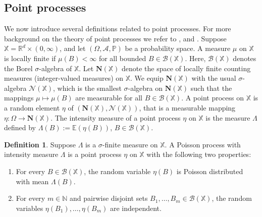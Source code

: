 \documentclass{article}
\newcommand{\NN}{\mathbb{N}}
\newcommand{\RR}{\mathbb{R}}
\newcommand{\PP}{\mathbb{P}}
\newcommand{\EE}{\mathbb{E}}
\theoremstyle{plain}
\theoremstyle{remark}
\theoremstyle{definition}
\newtheorem{definition}[theorem]{Definition}
\begin{document}
\subsection{Point processes}
We now introduce several definitions related to point processes. For more background on the theory of point processes we refer to \cite{Daley2003}, \cite{Daley2008} and \cite{Last2018}. Suppose $\mathbb{X} = \RR^d \times (0,\infty)$, and let $(\Omega, \mathcal{A},\PP)$ be a probability space. A measure $\mu$ on $\mathbb{X}$ is locally finite if $\mu(B) < \infty$ for all bounded $B \in \mathcal{B}(\mathbb{X})$. Here, $\mathcal{B}(\mathbb{X})$ denotes the Borel $\sigma$-algebra of $\mathbb{X}$. Let $\mathbf{N}(\mathbb{X})$ denote the space of locally finite counting measures (integer-valued measures) on $\mathbb{X}$. We equip $\mathbf{N}(\mathbb{X})$ with the usual $\sigma$-algebra $\mathcal{N}(\mathbb{X})$, which is the smallest $\sigma$-algebra on $\mathbf{N}(\mathbb{X})$ such that the mappings $\mu \mapsto \mu(B)$ are measurable for all $B \in \mathcal{B}(\mathbb{X})$. A point process on $\mathbb{X}$ is a random element $\eta$ of $(\mathbf{N}(\mathbb{X}), \mathcal{N}(\mathbb{X}))$, that is a measurable mapping $\eta:\Omega \to \mathbf{N}(\mathbb{X})$. The intensity measure of a point process $\eta$ on $\mathbb{X}$ is the measure $\Lambda$ defined by $\Lambda(B):= \EE(\eta(B))$, $B \in \mathcal{B}(\mathbb{X})$. 

\begin{definition}
    Suppose $\Lambda$ is a $\sigma$-finite measure on $\mathbb{X}$. A Poisson process with intensity measure $\Lambda$ is a point process $\eta$ on $\mathbb{X}$ with the following two properties:
\begin{enumerate}
    \item For every $B \in \mathcal{B}(\mathbb{X})$, the random variable $\eta(B)$ is Poisson distributed with mean $\Lambda(B)$.
    \item For every $m \in \NN$ and pairwise disjoint sets $B_1,\dots,B_m \in \mathcal{B}(\mathbb{X})$, the random variables $\eta(B_1),\dots,\eta(B_m)$ are independent.
\end{enumerate}
\end{definition}
\end{document}
